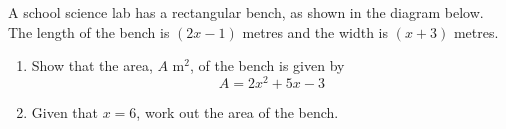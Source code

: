 \begin{question}
\noindent A school science lab has a rectangular bench, as shown in the diagram below. The length of the bench is $(2x - 1)$ metres and the width is $(x + 3)$ metres.

\begin{center}
\end{center}

\begin{enumerate}
    \item[(a)] Show that the area, $A$ m$^2$, of the bench is given by
    \[ A = 2x^2 + 5x - 3 \]
    \vspace{3.5cm}

    \item[(b)] Given that $x = 6$, work out the area of the bench.
    \vspace{2.5cm}
\end{enumerate}
\end{question}
